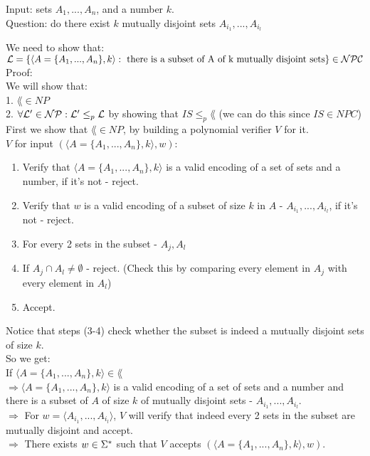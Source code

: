 Input: sets $A_1, ..., A_n$, and a number $k$. \\
Question: do there exist $k$ mutually disjoint sets $A_{i_1} , ..., A_{i_l}$

We need to show that: \\
$\mathcal{L} = \{\langle A = \{A_1, ..., A_n\}, k \rangle: \text{ there is a subset
        of A of k mutually disjoint sets}\} \in \mathcal{N}\mathcal{P}\mathcal{C}$ \\

Proof: \\
We will show that: \\
1. $\lang \in NP$ \\
2. $\forall \mathcal{L}' \in \mathcal{N}\mathcal{P}: \mathcal{L}' \leq_p \mathcal{L}$ by showing that $IS \leq_p \lang$ (we can do this since $IS \in NPC$) \\

First we show that $\lang \in NP$, by building a polynomial verifier $V$ for it. \\
$V$ for input $(\langle A = \{A_1, ..., A_n\}, k \rangle, w)$:
\begin{enumerate}[1., itemsep=5pt]
    \item Verify that $\langle A = \{A_1, ..., A_n\}, k \rangle$ is a valid encoding of a set of sets and a number, if it's not - reject.
    \item Verify that $w$ is a valid encoding of a subset of size $k$ in $A$ - $A_{i_1} , ..., A_{i_l}$, if it's not - reject.

    \item For every 2 sets in the subset - $A_j, A_l$
    \item \qquad If $A_j \cap A_l \neq \emptyset$ - reject. (Check this by comparing every element in $A_j$ with every element in $A_l$)

    \item Accept.

\end{enumerate}

Notice that steps (3-4) check whether the subset is indeed a mutually disjoint sets of size $k$.\\

So we get: \\
If $\langle A = \{A_1, ..., A_n\}, k \rangle \in \lang$ \\
$\Rightarrow \langle A = \{A_1, ..., A_n\}, k \rangle$ is a valid encoding of a set of sets and a number
and there is a subset of $A$ of size $k$ of mutually disjoint sets - $A_{i_1} , ..., A_{i_l}$.\\
$\Rightarrow $ For $w=\langle A_{i_1} , ..., A_{i_l} \rangle$, $V$ will verify that indeed every 2 sets in the
subset are mutually disjoint and accept. \\
$\Rightarrow $ There exists $w \in \Sigma^*$ such that $V$ accepts $(\langle A = \{A_1, ..., A_n\}, k \rangle, w)$. \\

